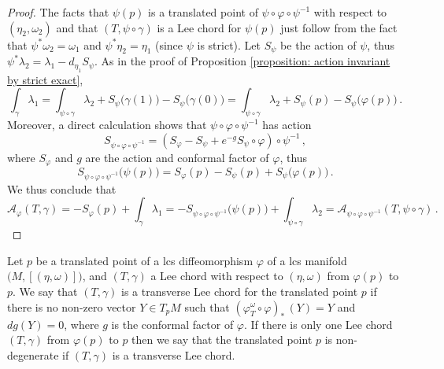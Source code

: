 \documentclass{amsart}
\theoremstyle{remark}
\begin{document}
\begin{proof}
The facts that $\psi(p)$ is a translated point
of $\psi \circ \varphi \circ \psi^{-1}$
with respect to $(\eta_2, \omega_2)$
and that $(T, \psi \circ \gamma)$ is a Lee chord for $\psi(p)$
just follow from the fact that $\psi^{\ast}\omega_2 = \omega_1$
and $\psi^{\ast}\eta_2 = \eta_1$
(since $\psi$ is strict).
Let $S_{\psi}$ be the action of $\psi$,
thus $\psi^{\ast}\lambda_2 = \lambda_1 - d_{\eta_1} S_{\psi}$.
As in the proof
of Proposition \ref{proposition: action invariant by strict exact},
\[
\int_{\gamma} \lambda_1
= \int_{\psi \circ \gamma} \lambda_2
+ S_{\psi} \big(\gamma(1)\big) - S_{\psi} \big(\gamma(0)\big)
= \int_{\psi \circ \gamma} \lambda_2 + S_{\psi} (p) - S_{\psi} \big(\varphi(p)\big) \,.
\]
Moreover,
a direct calculation shows that
$\psi \circ \varphi \circ \psi^{-1}$ has action
\[
S_{\psi \circ \varphi \circ \psi^{-1}}
= (S_{\varphi} - S_{\psi} + e^{-g} S_{\psi} \circ \varphi) \circ \psi^{-1} \,,
\]
where $S_{\varphi}$ and $g$ are the action and conformal factor of $\varphi$,
thus
\[
S_{\psi \circ \varphi \circ \psi^{-1}} \big( \psi(p) \big)
= S_{\varphi} (p) - S_{\psi} (p) + S_{\psi} \big(\varphi(p)\big) \,.
\]
We thus conclude that
\[
\mathcal{A}_{\varphi} (T, \gamma)
= - S_{\varphi} (p) + \int_{\gamma} \lambda_1
= - S_{\psi \circ \varphi \circ \psi^{-1}} \big( \psi(p) \big)
+ \int_{\psi \circ \gamma} \lambda_2
= \mathcal{A}_{\psi \circ \varphi \circ \psi^{-1}} (T, \psi \circ \gamma) \,.
\]
\end{proof}

Let $p$ be a translated point
of a lcs diffeomorphism $\varphi$
of a lcs manifold $\big( M , [(\eta, \omega)] \big)$,
and $(T, \gamma)$ a Lee chord
with respect to $(\eta, \omega)$ from $\varphi (p)$ to $p$.
We say that $(T, \gamma)$ is a transverse Lee chord
for the translated point $p$
if there is no non-zero vector $Y \in T_pM$
such that $(\varphi_T^{\omega} \circ \varphi)_{\ast} \, (Y) = Y$
and $dg (Y) = 0$,
where $g$ is the conformal factor of $\varphi$.
If there is only one Lee chord $(T, \gamma)$ from $\varphi (p)$ to $p$
then we say that the translated point $p$ is non-degenerate
if $(T, \gamma)$ is a transverse Lee chord.
\end{document}
